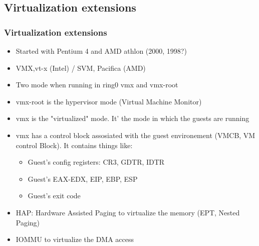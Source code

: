 \subsection{Virtualization extensions}
        \begin{frame}
        \frametitle{Virtualization extensions}
        \begin{itemize}
                \item Started with Pentium 4 and AMD athlon (2000,
                1998?) %
                \item VMX,vt-x (Intel) / SVM, Pacifica (AMD)
                \item Two mode when running in ring0 vmx and vmx-root
                \item vmx-root is the hypervisor mode (Virtual Machine
                Monitor)
                \item vmx is the "virtualized" mode. It' the mode in
                which the guests are running
                \item vmx has a control block assosiated with the guest
                environement (VMCB, VM control Block). It contains
                things like:
                        \begin{itemize}
                        \item Guest's config registers: CR3, GDTR, IDTR
                        \item Guest's EAX-EDX, EIP, EBP, ESP
                        \item Guest's exit code
                        \end{itemize}
               \item HAP: Hardware Assisted Paging to virtualize the
               memory (EPT, Nested Paging)
               \item IOMMU to virtualize the DMA access
        \end{itemize}
        \end{frame}

